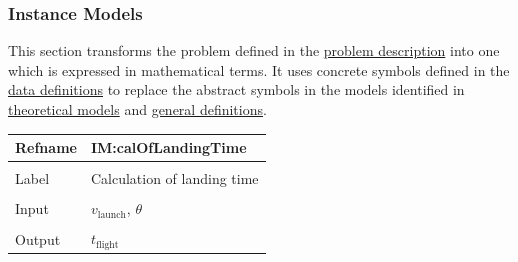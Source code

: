 \documentclass[12pt]{article}
\begin{document}
\subsubsection{Instance Models}
\label{Sec:IMs}
This section transforms the problem defined in the \hyperref[Sec:ProbDesc]{problem description} into one which is expressed in mathematical terms. It uses concrete symbols defined in the \hyperref[Sec:DDs]{data definitions} to replace the abstract symbols in the models identified in \hyperref[Sec:TMs]{theoretical models} and \hyperref[Sec:GDs]{general definitions}.

\vspace{\baselineskip}
\noindent
\begin{minipage}{\textwidth}
\begin{tabular}{>{\raggedright}p{}>{\raggedright\arraybackslash}p{}}
\toprule \textbf{Refname} & \textbf{IM:calOfLandingTime}
\label{IM:calOfLandingTime}
\\ \midrule \\
Label & Calculation of landing time
        
\\ \midrule \\
Input & ${v_{\text{launch}}}$, $θ$
        
\\ \midrule \\
Output & ${t_{\text{flight}}}$
         

\end{tabular}
\end{minipage}
\end{document}
